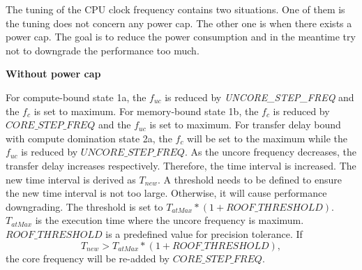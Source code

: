 %
The tuning of the CPU clock frequency contains two situations. One of them is the tuning does not concern any power cap. The other one is when there exists a power cap. The goal is to reduce the power consumption and in the meantime try not to downgrade the performance too much. 



\textbf{Without power cap}

For compute-bound state 1a, the $f_{uc}$ is reduced by \textit{UNCORE\_STEP\_FREQ} and the $f_c$ is set to maximum. For memory-bound state 1b, the $f_c$ is reduced by $CORE\_STEP\_FREQ$ and the $f_{uc}$ is set to maximum. For transfer delay bound with compute domination state 2a, the $f_{c}$ will be set to the maximum while the $f_{uc}$ is reduced by $UNCORE\_STEP\_FREQ$. As the uncore frequency decreases, the transfer delay increases respectively. Therefore, the time interval is increased. The new time interval is derived as $T_{new}$. A threshold needs to be defined to ensure the new time interval is not too large. Otherwise, it will cause performance downgrading. The threshold is set to $T_{atMax}* (1 + ROOF\_THRESHOLD)$. $T_{atMax}$ is the execution time where the uncore frequency is maximum. $ROOF\_THRESHOLD$ is a predefined value for precision tolerance. If
\begin{equation}
 T_{new} > T_{atMax} * (1 + ROOF\_THRESHOLD), 
\end{equation}
the core frequency will be re-added by $CORE\_STEP\_FREQ$.

